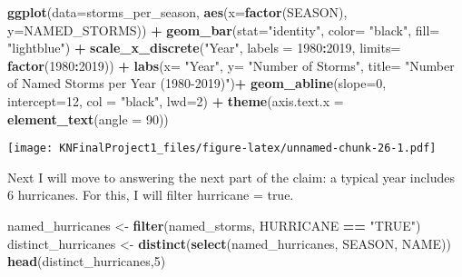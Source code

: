 \documentclass[
]{article}
\newenvironment{Shaded}{\begin{snugshade}}{\end{snugshade}}
\newcommand{\DataTypeTok}[1]{\textcolor[rgb]{0.13,0.29,0.53}{#1}}
\newcommand{\DecValTok}[1]{\textcolor[rgb]{0.00,0.00,0.81}{#1}}
\newcommand{\KeywordTok}[1]{\textcolor[rgb]{0.13,0.29,0.53}{\textbf{#1}}}
\newcommand{\NormalTok}[1]{#1}
\newcommand{\OperatorTok}[1]{\textcolor[rgb]{0.81,0.36,0.00}{\textbf{#1}}}
\newcommand{\StringTok}[1]{\textcolor[rgb]{0.31,0.60,0.02}{#1}}
\begin{document}
\begin{Shaded}
\begin{Highlighting}[]
\KeywordTok{ggplot}\NormalTok{(}\DataTypeTok{data=}\NormalTok{storms_per_season, }\KeywordTok{aes}\NormalTok{(}\DataTypeTok{x=}\KeywordTok{factor}\NormalTok{(SEASON), }\DataTypeTok{y=}\NormalTok{NAMED_STORMS)) }\OperatorTok{+}
\KeywordTok{geom_bar}\NormalTok{(}\DataTypeTok{stat=}\StringTok{"identity"}\NormalTok{, }\DataTypeTok{color=} \StringTok{"black"}\NormalTok{, }\DataTypeTok{fill=} \StringTok{"lightblue"}\NormalTok{) }\OperatorTok{+}\StringTok{ }
\StringTok{  }\KeywordTok{scale_x_discrete}\NormalTok{(}\StringTok{"Year"}\NormalTok{, }\DataTypeTok{labels =} \DecValTok{1980}\OperatorTok{:}\DecValTok{2019}\NormalTok{, }\DataTypeTok{limits=} \KeywordTok{factor}\NormalTok{(}\DecValTok{1980}\OperatorTok{:}\DecValTok{2019}\NormalTok{)) }\OperatorTok{+}\StringTok{  }
\StringTok{  }\KeywordTok{labs}\NormalTok{(}\DataTypeTok{x=} \StringTok{"Year"}\NormalTok{, }\DataTypeTok{y=} \StringTok{"Number of Storms"}\NormalTok{, }\DataTypeTok{title=} \StringTok{"Number of Named Storms per Year (1980-2019)"}\NormalTok{)}\OperatorTok{+}\StringTok{  }
\StringTok{  }\KeywordTok{geom_abline}\NormalTok{(}\DataTypeTok{slope=}\DecValTok{0}\NormalTok{, }\DataTypeTok{intercept=}\DecValTok{12}\NormalTok{,  }\DataTypeTok{col =} \StringTok{"black"}\NormalTok{, }\DataTypeTok{lwd=}\DecValTok{2}\NormalTok{) }\OperatorTok{+}\StringTok{ }\KeywordTok{theme}\NormalTok{(}\DataTypeTok{axis.text.x =} \KeywordTok{element_text}\NormalTok{(}\DataTypeTok{angle =} \DecValTok{90}\NormalTok{))   }
\end{Highlighting}
\end{Shaded}

\texttt{[image: KNFinalProject1\_files/figure-latex/unnamed-chunk-26-1.pdf]}

Next I will move to answering the next part of the claim: a typical year
includes 6 hurricanes. For this, I will filter hurricane = true.

\begin{Shaded}
\begin{Highlighting}[]
\NormalTok{named_hurricanes <-}\StringTok{ }\KeywordTok{filter}\NormalTok{(named_storms, HURRICANE }\OperatorTok{==}\StringTok{ "TRUE"}\NormalTok{)}
\NormalTok{distinct_hurricanes <-}\StringTok{ }\KeywordTok{distinct}\NormalTok{(}\KeywordTok{select}\NormalTok{(named_hurricanes, SEASON, NAME))}
\KeywordTok{head}\NormalTok{(distinct_hurricanes,}\DecValTok{5}\NormalTok{)}
\end{Highlighting}
\end{Shaded}
\end{document}
